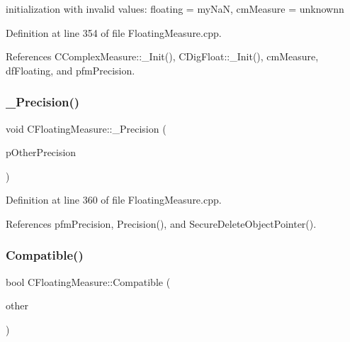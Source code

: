 initialization with invalid values\+: floating = my\+NaN, cm\+Measure = unknownn 



Definition at line 354 of file Floating\+Measure.\+cpp.



References C\+Complex\+Measure\+::\+\_\+\+Init(), C\+Dig\+Float\+::\+\_\+\+Init(), cm\+Measure, df\+Floating, and pfm\+Precision.

\mbox{\label{classCFloatingMeasure_a8e16f55f29d0d4c4148307a1f5953fe3}} 
\subsubsection{\texorpdfstring{\+\_\+\+Precision()}{\_Precision()}}
{\footnotesize\ttfamily void C\+Floating\+Measure\+::\+\_\+\+Precision (\begin{DoxyParamCaption}\item[{const \hyperlink{classCFloatingMeasure}{C\+Floating\+Measure} $\ast$}]{p\+Other\+Precision }\end{DoxyParamCaption})\hspace{0.3cm}{\ttfamily [protected]}}



Definition at line 360 of file Floating\+Measure.\+cpp.



References pfm\+Precision, Precision(), and Secure\+Delete\+Object\+Pointer().

\mbox{\label{classCFloatingMeasure_ae69672971857cf047c5bc7ab4b631b6c}} 
\subsubsection{\texorpdfstring{Compatible()}{Compatible()}\hspace{0.1cm}{\footnotesize\ttfamily [1/2]}}
{\footnotesize\ttfamily bool C\+Floating\+Measure\+::\+Compatible (\begin{DoxyParamCaption}\item[{const \hyperlink{classCFloatingMeasure}{C\+Floating\+Measure} \&}]{other }\end{DoxyParamCaption})\hspace{0.3cm}{\ttfamily [inline]}}



